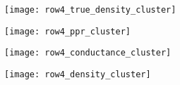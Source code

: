 \documentclass[11pt,twoside]{article}
\newcommand{\1}{\mathbbm{1}}
\begin{document}
\begin{figure}
	\centering
	\begin{adjustbox}{minipage=\linewidth,scale=0.8}
		\begin{subfigure}{.24\linewidth}
			\texttt{[image: row4\_true\_density\_cluster]}
			\caption{}
		\end{subfigure}
		\begin{subfigure}{.24\linewidth}
			\texttt{[image: row4\_ppr\_cluster]}
			\caption{}
		\end{subfigure}
		\begin{subfigure}{.24\linewidth}
			\texttt{[image: row4\_conductance\_cluster]}
			\caption{}
		\end{subfigure}
		\begin{subfigure}{.24\linewidth}
			\texttt{[image: row4\_density\_cluster]}
			\caption{}
		\end{subfigure}
		\caption{}
		\label{fig:moons_hd}
	\end{adjustbox}
\end{figure}

\clearpage


 
\end{document}
